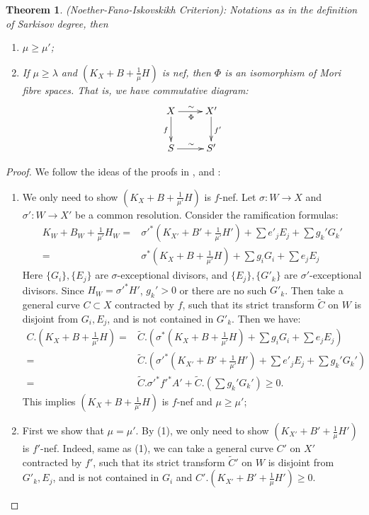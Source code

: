 \documentclass[11pt]{amsart}
\newtheorem{thm}[defn]{Theorem}
\begin{document}
\begin{thm}\label{nfi}
  (Noether-Fano-Iskovskikh Criterion): Notations as in the definition of Sarkisov degree, then 
  \begin{enumerate}
    \item $ \mu\geqslant \mu' $;
    \item If $ \mu \geqslant \lambda $ and $ (K_X+B+\frac{1}{\mu} H) $ is nef, then $\Phi$ is an isomorphism of Mori fibre spaces. That is, we have commutative diagram: 
      \[ \xymatrix{
          X\ar[r]^\sim_\Phi\ar[d]_f&X'\ar[d]^{f'}\\
      S\ar[r]^\sim& S' } \]
  \end{enumerate}
\end{thm}

\begin{proof}
  We follow the ideas of the proofs in \cite[Claim 13.20]{haconMinimalModelProgram2012}, \cite[Theorem 5.1]{liuSarkisovProgramGeneralized2021} and \cite[Theorem 4.2]{cortiFactoringBirationalMaps}:
  \begin{enumerate}
    \item We only need to show $ (K_X+B+\frac{1}{\mu'}H) $ is $ f $-nef.   Let $\sigma:W\to X$ and $\sigma':W\to X'$ be a common resolution. Consider the ramification formulas:
      \[
        \begin{aligned}  
          K_W+B_W+\frac{1}{\mu'}H_W=&\sigma'^*(K_{X'}+B'+\frac{1}{\mu'}H')+\sum e'_jE_j+ \sum g_k'G_k'\\
          =&\sigma^*(K_{X}+B+\frac{1}{\mu'}H)+\sum g_iG_i+\sum e_jE_j
        \end{aligned}
      \]
      Here $ \{G_i\}, \{E_j\} $ are $ \sigma $-exceptional divisors, and $ \{E_j\}, \{G'_k\} $ are $ \sigma' $-exceptional divisors. Since $H_W=\sigma'^*H' $, $ g_k'>0 $ or there are no such $ G'_k $. Then take a general curve $ C\subset X $ contracted by $ f $, such that its strict transform $ \tilde{C} $ on $ W $ is disjoint from $ G_i, E_j $, and is not contained in $ G'_k $. Then we have:
      \[
        \begin{aligned}
          C.\left(K_X+B+\frac{1}{\mu'}H\right)=&\tilde{C}.\left(\sigma^*\left(K_X+B+\frac{1}{\mu'}H\right)+\sum g_iG_i+\sum e_jE_j\right)\\
          =&\tilde{C}.\left(\sigma'^*\left(K_{X'}+B'+\frac{1}{\mu'}H'\right)+\sum e'_jE_j+ \sum g_k'G_k'\right)\\
          =&\tilde{C}.\sigma'^*f'^*A'+\tilde{C}.\left(\sum g_k'G_k'\right) \geqslant0 .
        \end{aligned}
      \]
     This implies $ (K_X+B+\frac{1}{\mu'}H) $ is $ f $-nef and $ \mu\geqslant \mu' $;
   \item  First we show that $ \mu=\mu' $. By (1), we only need to show $ (K_{X'}+B'+\frac{1}{\mu}H') $ is $ f' $-nef. Indeed,  same as (1), we can take a general curve $ C' $ on $X'$ contracted by $f'$, such that its strict transform $\tilde{C}'$ on $W$ is disjoint from  $ G'_k, E_j $, and is not contained in $ G_i $ and 
     $C'.\left(K_{X'}+B'+\frac{1}{\mu}H'\right)\geqslant 0$.


\end{enumerate}
\end{proof}
\end{document}
